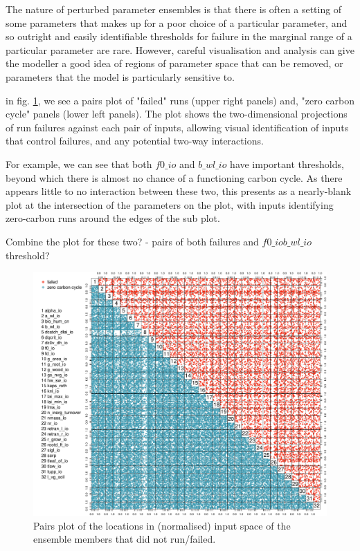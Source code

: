 \documentclass[gmd, manuscript]{copernicus}
\begin{document}
The nature of perturbed parameter ensembles is that there is often a setting of some parameters that makes up for a poor choice of a particular parameter, and so outright and easily identifiable thresholds for failure in the marginal range of a particular parameter are rare. However, careful visualisation and analysis can give the modeller a good idea of regions of parameter space that can be removed, or parameters that the model is particularly sensitive to.

in fig. \ref{fig:run-failure-pairs}, we see a pairs plot of "failed" runs (upper right panels) and, "zero carbon cycle" panels (lower left panels). The plot shows the two-dimensional projections of run failures against each pair of inputs, allowing visual identification of inputs that control failures, and any potential two-way interactions.

For example, we can see that both $f0\_io$ and $b\_wl\_io$ have important thresholds, beyond which there is almost no chance of a functioning carbon cycle. As there appears little to no interaction between these two, this presents as a nearly-blank plot at the intersection of the parameters on the plot, with inputs identifying zero-carbon runs around the edges of the sub plot.


Combine the plot for these two? - pairs of both failures and $f0\_io b\_wl\_io$ threshold?

\begin{figure}[t]
\includegraphics[width=12cm]{./graphics/run-failure-pairs.pdf}
\caption{Pairs plot of the locations in (normalised) input space of the ensemble members that did not run/failed.}
\label{fig:run-failure-pairs}
\end{figure}
\end{document}
